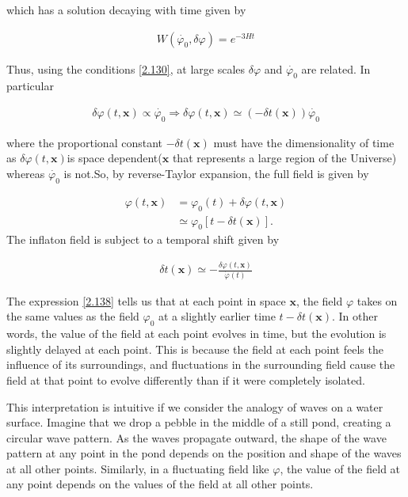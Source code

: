 which has a solution decaying with time given by

\begin{align}
    W(\dot{\varphi_0}, \delta \varphi )=e^{-3 H t}\label{2.135}
\end{align}

Thus, using the conditions \ref{2.130}, at large scales $\delta \varphi$ and $\dot{\varphi_0}$ are related. In particular

\begin{align}
    \delta \varphi(t, \mathbf{x}) \propto \dot{\varphi_0} \Rightarrow \delta \varphi(t, \mathbf{x}) \simeq(-\delta t(\mathbf{x})) \dot{\varphi_0}\label{2.136}
\end{align}

where the proportional constant $-\delta t(\mathbf{x})$ must have the dimensionality of time as $\delta \varphi(t, \mathbf{x})$is space dependent($\mathbf{x}$ that represents a large region of the Universe) whereas $\dot{\varphi_0}$ is not.So, by reverse-Taylor expansion, the full field is given by


\begin{align}
    \varphi(t, \mathbf{x}) & =\varphi_{0}(t)+\delta \varphi(t, \mathbf{x}) \label{2.137}\\
    & \simeq \varphi_{0}[t-\delta t(\mathbf{x})] .\label{2.138}
\end{align}
The inflaton field is subject to a temporal shift given by

\begin{align}
\delta t(\mathbf{x}) \simeq-\frac{\delta \varphi(t, \mathbf{x})}{\dot{\varphi}(t)}\label{2.139}
\end{align}


The expression \ref{2.138} tells us that at each point in space $\mathbf{x}$, the field $\varphi$ takes on the same values as the field $\varphi_{0}$ at a slightly earlier time $t-\delta t(\mathbf{x})$. In other words, the value of the field at each point evolves in time, but the evolution is slightly delayed at each point. This is because the field at each point feels the influence of its surroundings, and fluctuations in the surrounding field cause the field at that point to evolve differently than if it were completely isolated.

This interpretation is intuitive if we consider the analogy of waves on a water surface. Imagine that we drop a pebble in the middle of a still pond, creating a circular wave pattern. As the waves propagate outward, the shape of the wave pattern at any point in the pond depends on the position and shape of the waves at all other points. Similarly, in a fluctuating field like $\varphi$, the value of the field at any point depends on the values of the field at all other points.\

